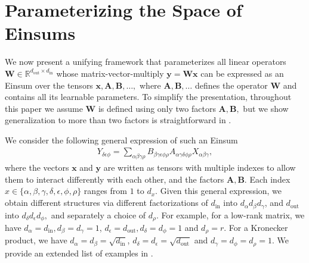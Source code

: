 \documentclass{article}
\newcommand{\mbf}[1]{{\boldsymbol{\mathbf{#1}}}}
\newcommand{\bm}{\mbf}
\newcommand{\din}{{d_\mathrm{in}}}
\newcommand{\dout}{{d_\mathrm{out}}}
\begin{document}
\section{Parameterizing the Space of Einsums}
We now present a unifying framework that parameterizes all linear operators $\bm{W} \in \mathbb{R}^{\dout \times \din}$ whose matrix-vector-multiply $\bm{y} = \bm{Wx}$ can be expressed as an Einsum over the tensors $\bm{x}, \bm{A}, \bm{B}, \ldots,$ where $\bm{A}, \bm{B}, \ldots$ defines the operator $\bm{W}$ and contains all its learnable parameters. To simplify the presentation, throughout this paper we assume $\bm{W}$ is defined using only two factors $\bm{A}, \bm{B},$ but we show generalization to more than two factors is straightforward in .

We consider the following general expression of such an Einsum
\begin{equation}\label{eq:general}
    \begin{split}
      Y_{\delta \epsilon \phi}
      =
      \sum_{\alpha \beta \gamma \rho}^{}
      B_{\beta \gamma \epsilon \phi \rho} A_{\alpha \gamma \delta \phi \rho} X_{\alpha \beta \gamma},
    \end{split}
\end{equation}
where the vectors $\bm{x}$ and $\bm{y}$ are written as tensors with multiple indexes to allow them to interact differently with each other, and the factors $\bm{A}, \bm{B}.$ Each index $x \in \{\alpha, \beta, \gamma, \delta, \epsilon, \phi, \rho\}$ ranges from $1$ to $d_x.$
Given this general expression, we obtain different structures via different factorizations of $\din$ into
$d_{\alpha} d_{\beta} d_{\gamma}$, and
$\dout$ into $d_{\delta} d_{\epsilon} d_{\phi},$ and separately a choice of $d_{\rho}$.
For example, for a low-rank matrix, we have $d_{\alpha} = \din, d_{\beta} = d_{\gamma} = 1$,
$d_{\epsilon} = \dout, d_{\delta} = d_{\phi} = 1$ and $d_{\rho} = r$.
For a Kronecker product, we have $d_{\alpha} = d_{\beta} = \sqrt{\din}$, $d_{\delta} = d_{\epsilon} = \sqrt{\dout}$
and $d_{\gamma} = d_{\phi} = d_{\rho} = 1$.
We provide an extended list of examples in .
\end{document}

